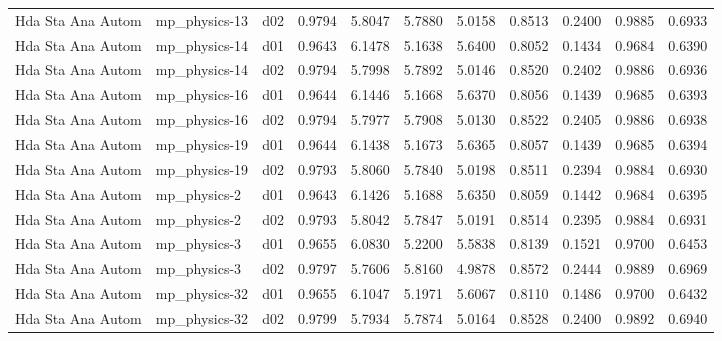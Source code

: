 \begin{longtable}{lllrrrrrrrr}
    Hda Sta Ana Autom  &         mp\_physics-13 &     d02 &   0.9794 &   5.8047 &   5.7880 &       5.0158 &        0.8513 &       0.2400 &           0.9885 &  0.6933 \\
    Hda Sta Ana Autom  &         mp\_physics-14 &     d01 &   0.9643 &   6.1478 &   5.1638 &       5.6400 &        0.8052 &       0.1434 &           0.9684 &  0.6390 \\
    Hda Sta Ana Autom  &         mp\_physics-14 &     d02 &   0.9794 &   5.7998 &   5.7892 &       5.0146 &        0.8520 &       0.2402 &           0.9886 &  0.6936 \\
    Hda Sta Ana Autom  &         mp\_physics-16 &     d01 &   0.9644 &   6.1446 &   5.1668 &       5.6370 &        0.8056 &       0.1439 &           0.9685 &  0.6393 \\
    Hda Sta Ana Autom  &         mp\_physics-16 &     d02 &   0.9794 &   5.7977 &   5.7908 &       5.0130 &        0.8522 &       0.2405 &           0.9886 &  0.6938 \\
    Hda Sta Ana Autom  &         mp\_physics-19 &     d01 &   0.9644 &   6.1438 &   5.1673 &       5.6365 &        0.8057 &       0.1439 &           0.9685 &  0.6394 \\
    Hda Sta Ana Autom  &         mp\_physics-19 &     d02 &   0.9793 &   5.8060 &   5.7840 &       5.0198 &        0.8511 &       0.2394 &           0.9884 &  0.6930 \\
    Hda Sta Ana Autom  &          mp\_physics-2 &     d01 &   0.9643 &   6.1426 &   5.1688 &       5.6350 &        0.8059 &       0.1442 &           0.9684 &  0.6395 \\
    Hda Sta Ana Autom  &          mp\_physics-2 &     d02 &   0.9793 &   5.8042 &   5.7847 &       5.0191 &        0.8514 &       0.2395 &           0.9884 &  0.6931 \\
    Hda Sta Ana Autom  &          mp\_physics-3 &     d01 &   0.9655 &   6.0830 &   5.2200 &       5.5838 &        0.8139 &       0.1521 &           0.9700 &  0.6453 \\
    Hda Sta Ana Autom  &          mp\_physics-3 &     d02 &   0.9797 &   5.7606 &   5.8160 &       4.9878 &        0.8572 &       0.2444 &           0.9889 &  0.6969 \\
    Hda Sta Ana Autom  &         mp\_physics-32 &     d01 &   0.9655 &   6.1047 &   5.1971 &       5.6067 &        0.8110 &       0.1486 &           0.9700 &  0.6432 \\
    Hda Sta Ana Autom  &         mp\_physics-32 &     d02 &   0.9799 &   5.7934 &   5.7874 &       5.0164 &        0.8528 &       0.2400 &           0.9892 &  0.6940 \\

\end{longtable}
